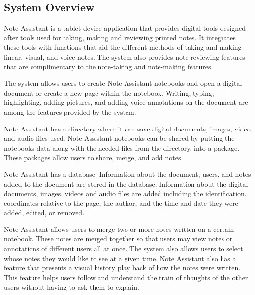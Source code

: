 %
%
%                 


\label{sec:thenoteassistantsystem}

\subsection{System Overview}
\label{systemoverview}

Note Assistant is a tablet device application that provides digital tools designed after tools used for taking, making and reviewing printed notes. It integrates these tools with functions that aid the different methods of taking and making linear, visual, and voice notes. The system also provides note reviewing features that are complimentary to the note-taking and note-making features.

The system allows users to create Note Assistant notebooks and open a digital document or create a new page within the notebook. Writing, typing, highlighting, adding pictures, and adding voice annotations on the document are among the features provided by the system.

Note Assistant has a directory where it can save digital documents, images, video and audio files used. Note Assistant notebooks can be shared by putting the notebooks data along with the needed files from the directory, into a package. These packages allow users to share, merge, and add notes. 

Note Assistant has a database. Information about the document, users, and notes added to the document are stored in the database. Information about the digital documents, images, videos and audio files are added including the identification, coordinates relative to the page, the author, and the time and date they were added, edited, or removed.

Note Assistant allows users to merge two or more notes written on a certain notebook. These notes are merged together so that users may view notes or annotations of different users all at once. The system also allows users to select whose notes they would like to see at a given time. Note Assistant also has a feature that presents a visual history play back of how the notes were written. This feature helps users follow and understand the train of thoughts of the other users without having to ask them to explain.


